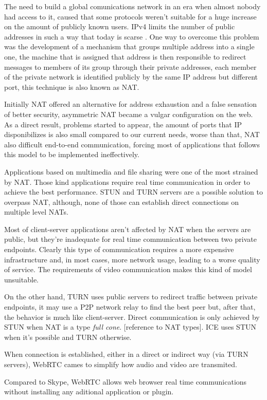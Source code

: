 The need to build a global comunications network in an era when almost nobody had access to it, caused that some protocols weren't suitable for a huge increase on the amount of publicly known users. \ac{IPv4} limits the number of public addresses in such a way that today is scarse \cite{ipv4}. One way to overcome this problem was the development of a mechanism that groups multiple address into a single one, the machine that is assigned that address is then responsible to redirect messages to members of its group through their private addresses, each member of the private network is identified publicly by the same \ac{IP} address but different port, this technique is also known as \ac{NAT}.

Initially \ac{NAT} offered an alternative for address exhaustion and a false sensation of better security, asymmetric \ac{NAT} became a vulgar configuration on the web. As a direct result, problems started to appear, the amount of ports that \ac{IP} disponibilizes is also small compared to our current needs, worse than that, \ac{NAT} also difficult end-to-end communication, forcing most of applications that follows this model to be implemented ineffectively.

Applications based on multimedia and file sharing were one of the most strained by \ac{NAT}. Those kind applications require real time communication in order to achieve the best performance. \ac{STUN} and \ac{TURN} \cite{natvoip} servers are a possible solution to overpass \ac{NAT}, although, none of those can establish direct connections on multiple level \ac{NAT}s.

Most of client-server applications aren't affected by \ac{NAT} when the servers are public, but they're inadequate for real time communication between two private endpoints. Clearly this type of communication requires a more expensive infrastructure and, in most cases, more network usage, leading to a worse quality of service. The requirements of video communication makes this kind of model unsuitable.

On the other hand, \ac{TURN} uses public servers to redirect traffic between private endpoints, it may use a P2P network relay to find the best peer but, after that, the behavior is much like client-server. Direct communication is only achieved by \ac{STUN} when \ac{NAT} is a type \textit{full cone}. {\color{red} [reference to \ac{NAT} types]}. \ac{ICE} uses \ac{STUN} when it's possible and \ac{TURN} otherwise.

When connection is established, either in a direct or indirect way (via \ac{TURN} servers), \ac{WebRTC} cames to simplify how audio and video are transmited.

Compared to Skype, \ac{WebRTC} allows web browser real time communications without installing any aditional application or plugin.
